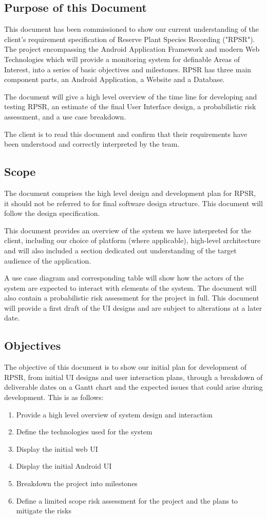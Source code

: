 \subsection{Purpose of this Document}
	This document has been commissioned to show our current understanding of the client's requirement specification of Reserve Plant Species Recording ("RPSR"). The project encompassing the Android Application Framework and modern Web Technologies which will provide a monitoring system for definable Areas of Interest, into a series of basic objectives and milestones. RPSR has three main component parts, an Android Application, a Website and a Database.

	The document will give a high level overview of the time line for developing and testing RPSR, an estimate of the final User Interface design, a probabilistic risk assessment, and a use case breakdown.

	The client is to read this document and confirm that their requirements have been understood and correctly interpreted by the team.
\subsection{Scope}
	The document comprises the high level design and development plan for RPSR, it should not be referred to for final software design structure. This document will follow the design specification.

	This document provides an overview of the system we have interpreted for the client, including our choice of platform (where applicable), high-level architecture and will also included a section dedicated out understanding of the target audience of the application.

	A use case diagram and corresponding table will show how the actors of the system are expected to interact with elements of the system. The document will also contain a probabilistic risk assessment for the project in full.
	This document will provide a first draft of the UI designs and are subject to alterations at a later date.\\
\subsection{Objectives}
	The objective of this document is to show our initial plan for development of RPSR, from initial UI designs and user interaction plans, through a breakdown of deliverable dates on a Gantt chart and the expected issues that could arise during development. This is as follows:
	\begin{enumerate}
	\item Provide a high level overview of system design and interaction
	\item Define the technologies used for the system
	\item Display the initial web UI
	\item Display the initial Android UI
	\item Breakdown the project into milestones
	\item Define a limited scope risk assessment for the project and the plans to mitigate the risks
	\end{enumerate}